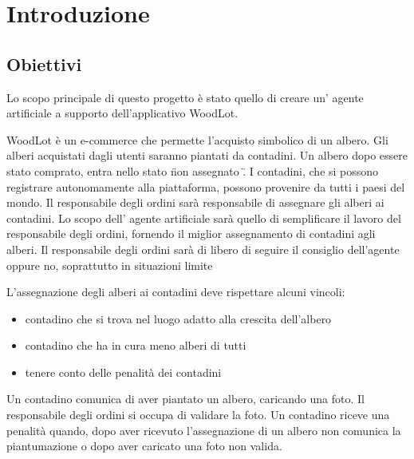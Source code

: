 \chapter{Introduzione}

\section{Obiettivi} %
Lo scopo principale di questo progetto è stato quello di creare un' agente artificiale a supporto dell'applicativo WoodLot.

WoodLot è un e-commerce che permette l'acquisto simbolico di un albero. Gli alberi acquistati dagli utenti saranno piantati da contadini. Un albero dopo essere stato comprato, entra nello stato \"non assegnato \" . I contadini, che si possono registrare autonomamente alla piattaforma, possono provenire da tutti i paesi del mondo.
Il responsabile degli ordini sarà responsabile di assegnare gli alberi ai contadini. Lo scopo dell' agente artificiale sarà quello di semplificare  il lavoro del responsabile degli ordini, fornendo il miglior assegnamento di contadini agli alberi. Il responsabile degli ordini sarà di libero di seguire il consiglio dell'agente oppure no, soprattutto in situazioni limite 

L'assegnazione degli alberi ai contadini deve rispettare alcuni vincoli: 
\begin{itemize}
\item contadino che si trova nel luogo adatto alla crescita dell'albero
\item contadino che ha in cura meno alberi di tutti 
\item tenere conto delle penalità dei contadini
\end{itemize}
Un contadino comunica di aver piantato un albero, caricando una foto. Il responsabile degli ordini si occupa di validare la foto. 
Un contadino riceve una penalità quando, dopo aver ricevuto l'assegnazione di un albero non comunica la piantumazione o dopo aver caricato una foto non valida. 


